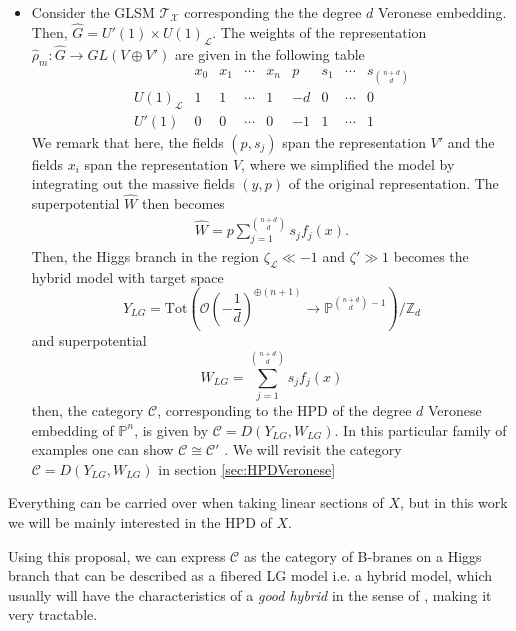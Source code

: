 \documentclass[a4paper,11pt]{article}
\numberwithin{equation}{section}
\begin{document}
\begin{itemize}
 \item Consider the GLSM $\mathcal{T}_{\mathcal{X}}$ corresponding the the 
degree $d$ Veronese embedding. Then, $\widehat{G}=U'(1)\times 
U(1)_{\mathcal{L}}$. The weights of the representation $\hat{\rho}_{m}: 
\widehat{G}\rightarrow GL(V\oplus V')$ are given in the following table 
 \[
\begin{array}{ccccccccccc}
& x_0 & x_1 & \cdots & x_n & p & s_1 & \cdots & s_{{n+d\choose 
d}} \\
U(1)_{\mathcal{L}} & 1 & 1 & \cdots & 1 & -d & 0 & \cdots & 0 \\
U'(1) & 0 & 0 & \cdots & 0 & -1 &   1 & \cdots & 1
\end{array}
\]
We remark that here, the fields $(p,s_{j})$ span the representation $V'$ and 
the 
fields $x_{i}$ span the representation $V$, where we simplified the model by 
integrating 
out the massive fields $(y,p)$ of the original representation. The 
superpotential $\widehat{W}$ then becomes
\begin{eqnarray}
\widehat{W}=p\sum_{j=1}^{{n+d\choose 
d}}s_{j}f_{j}(x).
\end{eqnarray}
Then, the Higgs branch in the region $\zeta_{\mathcal{L}}\ll-1$ and $\zeta'\gg 
1$ becomes the hybrid model with target space
\begin{equation}
Y_{LG}=\mathrm{Tot}\left( \mathcal{O}\left( -\frac{1}{d} \right)^{\oplus(n+1)} 
\rightarrow \mathbb{P}^{{n+d \choose d}-1} \right)/\mathbb{Z}_d
\end{equation}
and superpotential
\begin{equation}
W_{LG}=\sum_{j=1}^{{n+d\choose 
d}}s_{j}f_{j}(x)
\end{equation}
then, the category $\mathcal{C}$, corresponding to the HPD of the degree $d$ 
Veronese embedding of $\mathbb{P}^{n}$, is given by 
$\mathcal{C}=D(Y_{LG},W_{LG})$. In this particular family of examples one can 
show $\mathcal{C}\cong \mathcal{C}'$ \cite{Chen:2020iyo}. We will revisit the 
category $\mathcal{C}=D(Y_{LG},W_{LG})$ in section \ref{sec:HPDVeronese}
\end{itemize}




Everything 
can be carried over when 
taking linear sections of $X$, but in this work we will be mainly interested in 
the HPD of $X$.

Using this proposal, we can express $\mathcal{C}$ as the category of B-branes 
on a Higgs branch that can be described as a fibered LG model i.e. a hybrid 
model, which usually will have the 
characteristics of a \emph{good 
hybrid} in the sense of \cite{Aspinwall:2009qy,Bertolini:2013xga}, making it 
very tractable. 
\end{document}
